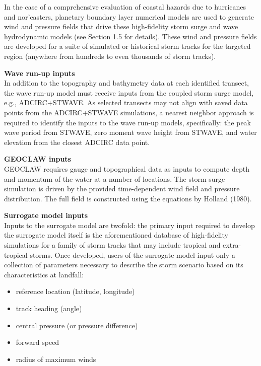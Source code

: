 In the case of a comprehensive evaluation of coastal hazards due to hurricanes and nor’easters, planetary boundary layer numerical models are used to generate wind and pressure fields that drive these high-fidelity storm surge and wave hydrodynamic models (see Section 1.5 for details). These wind and pressure fields are developed for a suite of simulated or historical storm tracks for the targeted region (anywhere from hundreds to even thousands of storm tracks).
\newline

\noindent\textbf{Wave run-up inputs} \\In addition to the topography and bathymetry data at each identified transect, the wave run-up model must receive inputs from the coupled storm surge model, e.g., ADCIRC+STWAVE. As selected transects may not align with saved data points from the ADCIRC+STWAVE simulations, a nearest neighbor approach is required to identify the inputs to the wave run-up models, specifically: the peak wave period from STWAVE, zero moment wave height from STWAVE, and water elevation from the closest ADCIRC data point. 
\newline

\noindent\textbf{GEOCLAW inputs} \\GEOCLAW requires gauge and topographical data as inputs to compute depth and momentum of the water at a number of locations. The storm surge simulation is driven by the provided time-dependent wind field and pressure distribution. The full field is constructed using the equations by Holland (1980).
\newline

\noindent\textbf{Surrogate model inputs} \\Inputs to the surrogate model are twofold: the primary input required to develop the surrogate model itself is the aforementioned database of high-fidelity simulations for a family of storm tracks that may include tropical and extra-tropical storms. Once developed, users of the surrogate model input only a collection of parameters necessary to describe the storm scenario based on its characteristics at landfall: 

\begin{itemize}
    \item reference location (latitude, longitude)
    \item track heading (angle)
    \item central pressure (or pressure difference)
    \item forward speed
    \item radius of maximum winds
\end{itemize}

